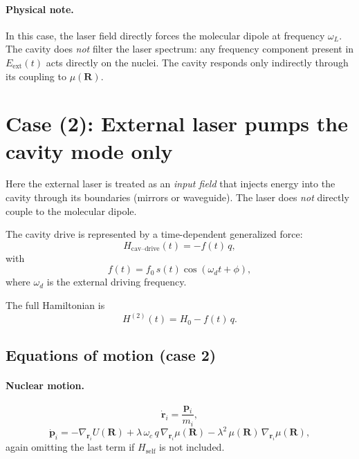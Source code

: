 \documentclass[11pt]{article}
\begin{document}
\paragraph{Physical note.}
In this case, the laser field directly forces the molecular dipole at frequency
$\omega_L$. The cavity does \emph{not} filter the laser spectrum: any frequency
component present in $E_{\text{ext}}(t)$ acts directly on the nuclei.
The cavity responds only indirectly through its coupling to $\mu(\bm R)$.

\section{Case (2): External laser pumps the cavity mode only}

Here the external laser is treated as an \emph{input field} that injects energy
into the cavity through its boundaries (mirrors or waveguide).
The laser does \emph{not} directly couple to the molecular dipole.

The cavity drive is represented by a time-dependent generalized force:
\begin{equation}
H_{\text{cav--drive}}(t)= - f(t)\,q,
\end{equation}
with
\begin{equation}
f(t)=f_0\,s(t)\cos(\omega_d t+\phi),
\end{equation}
where $\omega_d$ is the external driving frequency.

The full Hamiltonian is
\begin{equation}
H^{(2)}(t)=H_0 - f(t)\,q.
\end{equation}

\subsection*{Equations of motion (case 2)}

\paragraph{Nuclear motion.}
\begin{equation}
\dot{\bm r}_i=\frac{\bm p_i}{m_i},
\end{equation}
\begin{equation}
\dot{\bm p}_i=
-\nabla_{\bm r_i}U(\bm R)
+\lambda\,\omega_c\, q\,\nabla_{\bm r_i}\mu(\bm R)
-\lambda^2\,\mu(\bm R)\,\nabla_{\bm r_i}\mu(\bm R),
\end{equation}
again omitting the last term if $H_{\text{self}}$ is not included.
\end{document}
